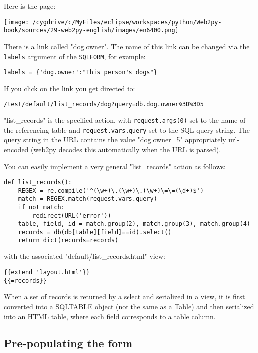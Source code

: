 \documentclass[justified,sixbynine,notoc]{tufte-book}
\def\ft{\small\tt}
\begin{document}
\begin{fullwidth}
Here is the page:


\goodbreak\begin{center}\texttt{[image: /cygdrive/c/MyFiles/eclipse/workspaces/python/Web2py-book/sources/29-web2py-english/images/en6400.png]}\end{center}


There is a link called "dog.owner". The name of this link can be changed via the {\ft labels} argument of the {\ft SQLFORM}, for example:
\begin{lstlisting}
labels = {'dog.owner':"This person's dogs"}
\end{lstlisting}

If you click on the link you get directed to:
\begin{lstlisting}
/test/default/list_records/dog?query=db.dog.owner%3D%3D5
\end{lstlisting}

"list\_records" is the specified action, with {\ft request.args(0)} set to the name of the referencing table and {\ft request.vars.query} set to the SQL query string.
The query string in the URL
contains the value "dog.owner=5" appropriately url-encoded
(web2py decodes this automatically when the URL is parsed).

You can easily implement a very general "list\_records" action as follows:
\begin{lstlisting}
def list_records():
    REGEX = re.compile('^(\w+)\.(\w+)\.(\w+)\=\=(\d+)$')
    match = REGEX.match(request.vars.query)
    if not match:
        redirect(URL('error'))
    table, field, id = match.group(2), match.group(3), match.group(4)
    records = db(db[table][field]==id).select()
    return dict(records=records)
\end{lstlisting}
\noindent with the associated "default/list\_records.html" view:
\begin{lstlisting}[keywords={}]
{{extend 'layout.html'}}
{{=records}}
\end{lstlisting}

When a set of records is returned by a select and serialized in a view, it is first converted into a SQLTABLE object (not the same as a Table) and then serialized into an HTML table, where each field corresponds to a table column.

\goodbreak\subsection{Pre-populating the form}


\end{fullwidth}
\end{document}
